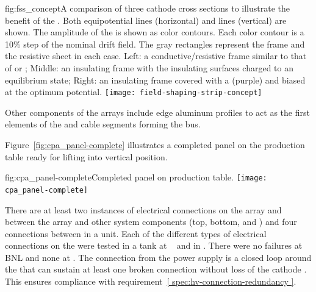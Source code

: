 \begin{dunefigure}{fig:fss_concept}{A comparison of three cathode cross sections to illustrate the benefit of the . Both equipotential lines (horizontal) and \efield{} lines (vertical) are shown.  The amplitude of the \efield{} is shown as color contours. Each color contour is a 10\% step of the nominal drift field.  The gray rectangles represent the frame and the resistive sheet in each case. Left: a conductive/resistive frame similar to that of  or ; Middle: an insulating frame with the insulating surfaces charged to an equilibrium state; Right: an insulating frame covered with a  (purple) and biased at the optimum potential. }
\texttt{[image: field-shaping-strip-concept]} %
\end{dunefigure}

Other  components of the  arrays include  edge aluminum profiles to act as the first elements of the  and cable segments forming the  bus.

Figure~\ref{fig:cpa_panel-complete} illustrates a completed   panel on the production table ready for lifting into vertical position. %

\begin{dunefigure}{fig:cpa_panel-complete}{Completed   panel on production table.}
\texttt{[image: cpa\_panel-complete]}
\end{dunefigure}

There are at least two instances of electrical connections on the  array and between the  array and other  system components (top, bottom, and ) and four connections between  in a  unit.  Each of the different types of electrical connections on the  were tested in a  tank at ~\cite{bib:docdb2338}  and in . There were no failures at BNL and none at .  The  connection from the  power supply is a closed loop around the  that can sustain at least one broken connection without loss of the cathode .  This ensures compliance with requirement~\ref{ spec:hv-connection-redundancy }.

